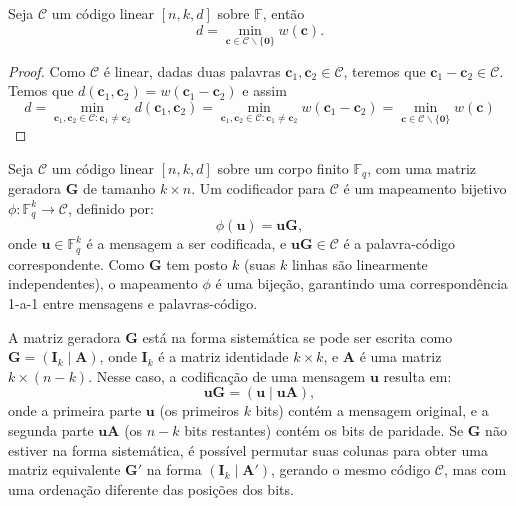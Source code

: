 \begin{proposition}
Seja $\mathcal{C}$ um código linear $[n,k,d]$ sobre $\mathbb{F}$, então
\begin{equation}
	  d = \min_{\mathbf{c} \in \mathcal{C} \backslash \{\mathbf{0}\}}  w(\mathbf{c}) .
\end{equation}
\end{proposition}
\begin{proof}
Como $\mathcal{C}$ é linear, dadas duas palavras $\mathbf{c}_1, \mathbf{c}_2 \in \mathcal{C}$, teremos
que $\mathbf{c}_1 - \mathbf{c}_2 \in \mathcal{C}$. 
Temos que $d(\mathbf{c}_1, \mathbf{c}_2) = w(\mathbf{c}_1 - \mathbf{c}_2)$ e assim
\begin{equation}
 d = \min_{\mathbf{c}_1, \mathbf{c}_2 \in \mathcal{C}: \mathbf{c}_1 \neq \mathbf{c}_2} d(\mathbf{c}_1, \mathbf{c}_2) = \min_{\mathbf{c}_1, \mathbf{c}_2 \in \mathcal{C}: \mathbf{c}_1 \neq \mathbf{c}_2} w(\mathbf{c}_1 - \mathbf{c}_2) = \min_{\mathbf{c} \in \mathcal{C}\backslash\{\mathbf{0}\}} w(\mathbf{c})
\end{equation}
\end{proof}




\begin{definition}
Seja $\mathcal{C}$ um código linear $[n, k, d]$ sobre um corpo finito $\mathbb{F}_q$, 
com uma matriz geradora $\mathbf{G}$ de tamanho $k \times n$. 
Um codificador para $\mathcal{C}$ é um mapeamento bijetivo 
$\phi: \mathbb{F}_q^k \to \mathcal{C}$, definido por:
\begin{equation}
\phi(\mathbf{u}) = \mathbf{u} \mathbf{G},
\end{equation}
onde $\mathbf{u} \in \mathbb{F}_q^k$ é a mensagem a ser codificada, e 
$\mathbf{u} \mathbf{G} \in \mathcal{C}$ é a palavra-código correspondente. 
Como $\mathbf{G}$ tem posto $k$ (suas $k$ linhas são linearmente independentes), 
o mapeamento $\phi$ é uma bijeção, garantindo uma correspondência 1-a-1 entre mensagens e palavras-código.

A matriz geradora $\mathbf{G}$ está na forma sistemática se pode ser escrita como $\mathbf{G} = (\mathbf{I}_k \mid \mathbf{A})$, 
onde $\mathbf{I}_k$ é a matriz identidade $k \times k$, e $\mathbf{A}$ é uma matriz $k \times (n-k)$. 
Nesse caso, a codificação de uma mensagem $\mathbf{u}$ resulta em:
\begin{equation}
\mathbf{u} \mathbf{G} = (\mathbf{u} \mid \mathbf{u} \mathbf{A}),
\end{equation}
onde a primeira parte $\mathbf{u}$ (os primeiros $k$ bits) contém a mensagem original, 
e a segunda parte $\mathbf{u} \mathbf{A}$ (os $n-k$ bits restantes) contém os bits de paridade. 
Se $\mathbf{G}$ não estiver na forma sistemática, é possível permutar suas colunas para obter 
uma matriz equivalente $\mathbf{G}'$ na forma $(\mathbf{I}_k \mid \mathbf{A}')$, 
gerando o mesmo código $\mathcal{C}$, mas com uma ordenação diferente das posições dos bits.
\end{definition}


